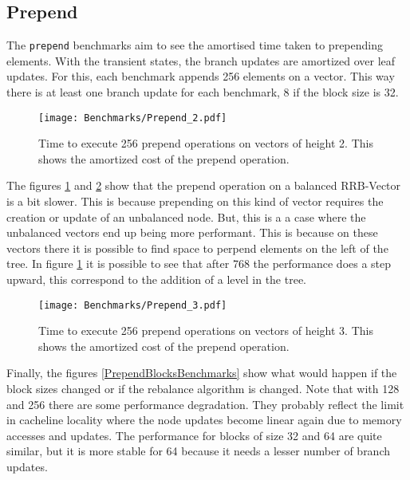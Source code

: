 \FloatBarrier

\subsection{Prepend}
The \texttt{prepend} benchmarks aim to see the amortised time taken to prepending elements. With the transient states, the branch updates are amortized over leaf updates. For this, each benchmark appends 256 elements on a vector. This way there is at least one branch update for each benchmark, 8 if the block size is 32.


\begin{figure}[h!]
  \centering
  \texttt{[image: Benchmarks/Prepend\_2.pdf]}
  \caption{Time to execute 256 prepend operations on vectors of height 2. This shows the amortized cost of the prepend operation.}
  \label{Prepend2Benchmarks}
\end{figure}

The figures \ref{Prepend2Benchmarks} and \ref{Prepend3Benchmarks} show that the prepend operation on a balanced RRB-Vector is a bit slower. This is because prepending on this kind of vector requires the creation or update of an unbalanced node. But, this is a a case where the unbalanced vectors end up being more performant. This is because on these vectors there it is possible to find space to perpend elements on the left of the tree. In figure \ref{Prepend2Benchmarks} it is possible to see that after 768 the performance does a step upward, this correspond to the addition of a level in the tree.

\begin{figure}[h!]
  \centering
  \texttt{[image: Benchmarks/Prepend\_3.pdf]}
  \caption{Time to execute 256 prepend operations on vectors of height 3. This shows the amortized cost of the prepend operation.}
  \label{Prepend3Benchmarks}
\end{figure}

\FloatBarrier

Finally, the figures \ref{PrependBlocksBenchmarks} show what would happen if the block sizes changed or if the rebalance algorithm is changed. Note that with 128 and 256 there are some performance degradation. They probably reflect the limit in cacheline locality where the node updates become linear again due to memory accesses and updates. The performance for blocks of size 32 and 64 are quite similar, but it is more stable for 64 because it needs a lesser number of branch updates.


